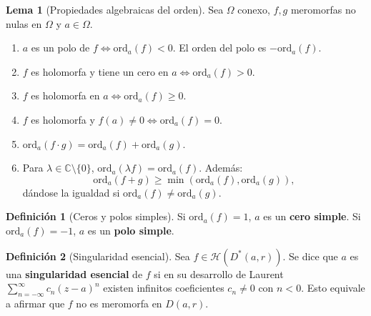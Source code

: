 \documentclass[11pt,a4paper]{article}
\theoremstyle{definition}
\newtheorem{definicion}{Definición}[section]
\newtheorem{lema}{Lema}[section]
\theoremstyle{remark}
\numberwithin{equation}{section}
\begin{document}
\begin{lema}[Propiedades algebraicas del orden]
Sea $\Omega$ conexo, $f, g$ meromorfas no nulas en $\Omega$ y $a \in \Omega$.
\begin{enumerate}
\item $a$ es un polo de $f \iff \mathrm{ord}_a(f) < 0$. El orden del polo es $-\mathrm{ord}_a(f)$.
\item $f$ es holomorfa y tiene un cero en $a \iff \mathrm{ord}_a(f) > 0$.
\item $f$ es holomorfa en $a \iff \mathrm{ord}_a(f) \ge 0$.
\item $f$ es holomorfa y $f(a) \neq 0 \iff \mathrm{ord}_a(f) = 0$.
\item $\mathrm{ord}_a(f \cdot g) = \mathrm{ord}_a(f) + \mathrm{ord}_a(g)$.
\item Para $\lambda \in \mathbb{C} \setminus \{0\}$, $\mathrm{ord}_a(\lambda f) = \mathrm{ord}_a(f)$. Además:
\begin{equation}
\mathrm{ord}_a(f + g) \ge \min(\mathrm{ord}_a(f), \mathrm{ord}_a(g)),
\end{equation}
dándose la igualdad si $\mathrm{ord}_a(f) \neq \mathrm{ord}_a(g)$.
\end{enumerate}
\end{lema}

\begin{definicion}[Ceros y polos simples]
Si $\mathrm{ord}_a(f) = 1$, $a$ es un \textbf{cero simple}. Si $\mathrm{ord}_a(f) = -1$, $a$ es un \textbf{polo simple}.
\end{definicion}

\begin{definicion}[Singularidad esencial]
Sea $f \in \mathcal{H}(D^*(a,r))$. Se dice que $a$ es una \textbf{singularidad esencial} de $f$ si en su desarrollo de Laurent $\sum_{n=-\infty}^\infty c_n (z-a)^n$ existen infinitos coeficientes $c_n \neq 0$ con $n < 0$. Esto equivale a afirmar que $f$ no es meromorfa en $D(a,r)$.
\end{definicion}
\end{document}
